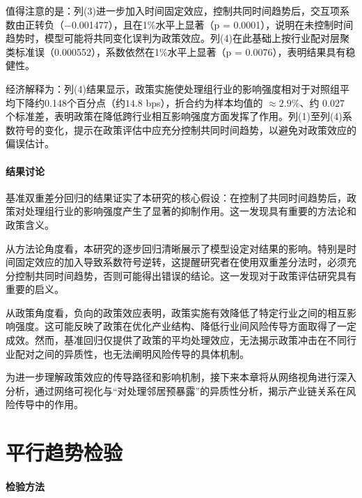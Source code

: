 值得注意的是：列(3)进一步加入时间固定效应，控制共同时间趋势后，交互项系数由正转负（$-$0.001477），且在1\%水平上显著（p = 0.0001），说明在未控制时间趋势时，模型可能将共同变化误判为政策效应。列(4)在此基础上按行业配对层聚类标准误（0.000552），系数依然在1\%水平上显著（p = 0.0076），表明结果具有稳健性。

经济解释为：列(4)结果显示，政策实施使处理组行业的影响强度相对于对照组平均下降约0.148个百分点（约$14.8$ bps），折合约为样本均值的 $\approx2.9\%$、约 $0.027$ 个标准差，表明政策在降低跨行业相互影响强度方面发挥了作用。列(1)至列(4)系数符号的变化，提示在政策评估中应充分控制共同时间趋势，以避免对政策效应的偏误估计。


\paragraph{结果讨论}

基准双重差分回归的结果证实了本研究的核心假设：在控制了共同时间趋势后，政策对处理组行业的影响强度产生了显著的抑制作用。这一发现具有重要的方法论和政策含义。

从方法论角度看，本研究的逐步回归清晰展示了模型设定对结果的影响。特别是时间固定效应的加入导致系数符号逆转，这提醒研究者在使用双重差分法时，必须充分控制共同时间趋势，否则可能得出错误的结论。这一发现对于政策评估研究具有重要的启义。

从政策角度看，负向的政策效应表明，政策实施有效降低了特定行业之间的相互影响强度。这可能反映了政策在优化产业结构、降低行业间风险传导方面取得了一定成效。然而，基准回归仅提供了政策的平均处理效应，无法揭示政策冲击在不同行业配对之间的异质性，也无法阐明风险传导的具体机制。

为进一步理解政策效应的传导路径和影响机制，接下来本章将从网络视角进行深入分析，通过网络可视化与“对处理邻居预暴露”的异质性分析，揭示产业链关系在风险传导中的作用。


\section{平行趋势检验}
\label{sec:parallel_trends}

\paragraph{检验方法}


